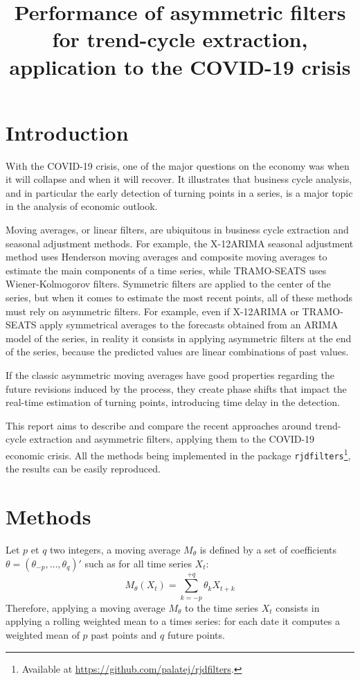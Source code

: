 \documentclass[12pt,,a4paper]{article}
\title{
\vspace{-5ex}
\thetitle
\vspace{-2ex}
}
\author{
\theauthors
\vspace{-5ex}
}
\date{}
\title{Performance of asymmetric filters for trend-cycle extraction, application to the COVID-19 crisis}
\date{}
\begin{document}
\maketitle

\hypertarget{introduction}{%
\section{Introduction}\label{introduction}}

With the COVID-19 crisis, one of the major questions on the economy was when it will collapse and when it will recover.
It illustrates that business cycle analysis, and in particular the early detection of turning points in a series, is a major topic in the analysis of economic outlook.

Moving averages, or linear filters, are ubiquitous in business cycle extraction and seasonal adjustment methods.
For example, the X-12ARIMA seasonal adjustment method uses Henderson moving averages and composite moving averages to estimate the main components of a time series, while TRAMO-SEATS uses Wiener-Kolmogorov filters.
Symmetric filters are applied to the center of the series, but when it comes to estimate the most recent points, all of these methods must rely on asymmetric filters.
For example, even if X-12ARIMA or TRAMO-SEATS apply symmetrical averages to the forecasts obtained from an ARIMA model of the series, in reality it consists in applying asymmetric filters at the end of the series, because the predicted values are linear combinations of past values.

If the classic asymmetric moving averages have good properties regarding the future revisions induced by the process, they create phase shifts that impact the real-time estimation of turning points, introducing time delay in the detection.

This report aims to describe and compare the recent approaches around trend-cycle extraction and asymmetric filters, applying them to the COVID-19 economic crisis.
All the methods being implemented in the  package \texttt{rjdfilters}\footnote{Available at \url{https://github.com/palatej/rjdfilters}.}, the results can be easily reproduced.

\hypertarget{methods}{%
\section{Methods}\label{methods}}

Let \(p\) et \(q\) two integers, a moving average \(M_\theta\) is defined by a set of coefficients \(\theta=(\theta_{-p},\dots,\theta_{q})'\) such as for all time series \(X_t\):
\[
M_\theta(X_t)=\sum_{k=-p}^{+q}\theta_kX_{t+k}
\]
Therefore, applying a moving average \(M_\theta\) to the time series \(X_t\) consists in applying a rolling weighted mean to a times series: for each date it computes a weighted mean of \(p\) past points and \(q\) future points.
\end{document}
